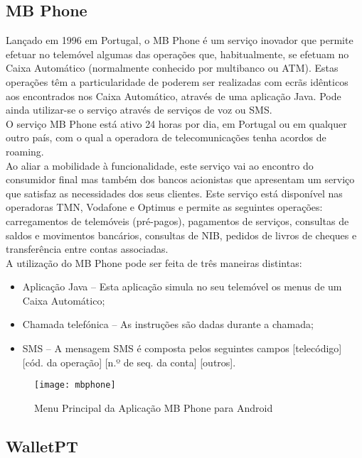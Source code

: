 \subsection{MB Phone}

Lançado em 1996 em Portugal, o MB Phone é um serviço inovador que permite efetuar no telemóvel algumas das operações que, habitualmente, se efetuam no Caixa Automático (normalmente conhecido por multibanco ou ATM). Estas operações têm a particularidade de poderem ser realizadas com ecrãs idênticos aos encontrados nos Caixa Automático, através de uma aplicação Java. Pode ainda utilizar-se o serviço através de serviços de voz ou SMS. 
\\O serviço MB Phone está ativo 24 horas por dia, em Portugal ou em qualquer outro país, com o qual a operadora de telecomunicações tenha acordos de roaming.
\\Ao aliar a mobilidade à funcionalidade, este serviço vai ao encontro do consumidor final mas também dos bancos acionistas que apresentam um serviço que satisfaz as necessidades dos seus clientes. Este serviço está disponível nas operadoras TMN, Vodafone e Optimus e permite as seguintes operações: carregamentos de telemóveis (pré-pagos), pagamentos de serviços, consultas de saldos e movimentos bancários, consultas de NIB, pedidos de livros de cheques e transferência entre contas associadas.\cite{mbphone}
\\A utilização do MB Phone pode ser feita de três maneiras distintas:
\begin{itemize}
\item Aplicação Java – Esta aplicação simula no seu telemóvel os menus de um Caixa Automático;
\item Chamada telefónica – As instruções são dadas durante a chamada;
\item SMS – A mensagem SMS é composta pelos seguintes campos [telecódigo] [cód. da operação] [n.º de seq. da conta] [outros].
\end{itemize}

\begin{figure}[t]
  \begin{center}
    \leavevmode
    \texttt{[image: mbphone]}
    \caption{Menu Principal da Aplicação MB Phone para Android}
    \label{fig:mbphone}
  \end{center}
\end{figure}

\subsection{WalletPT} 

